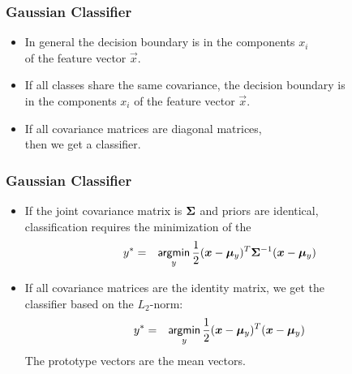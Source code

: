 \begin{frame}
  \frametitle{Gaussian Classifier \cont}


  \begin{itemize}
    \item In general the decision boundary is  in the components $x_i$ \\ 
      of the feature vector $\vec x$. \\[.5cm]
    \item If all classes share the same covariance, the decision boundary is  \\
      in the components $x_i$ of the feature vector $\vec x$. \\[.5cm]
    \item If all covariance matrices are diagonal matrices, \\
      then we get a  classifier.
  \end{itemize}
\end{frame}


\begin{frame}
  \frametitle{Gaussian Classifier \cont}

  
  \begin{itemize}
    \item If the joint covariance matrix is ${\bm \Sigma}$ and priors are identical, \\
      classification requires the minimization of the 
      \begin{eqnarray*}
        y^* &=& \mathop{\mathsf{argmin}}_{y} \frac{1}{2} ({\bm x}-{\bm \mu}_y)^T{\bm \Sigma}^{-1}({\bm x}-{\bm \mu}_y)
      \end{eqnarray*}
      \pause 
    \item If all covariance matrices are the identity matrix, we get the \\
       classifier based on the $L_2$-norm:
      \begin{eqnarray*}
        y^* &=& \mathop{\mathsf{argmin}}_{y} \frac{1}{2} ({\bm x}-{\bm \mu}_y)^T({\bm x}-{\bm \mu}_y)
      \end{eqnarray*}
      The prototype vectors are the mean vectors.
  \end{itemize}
\end{frame}


